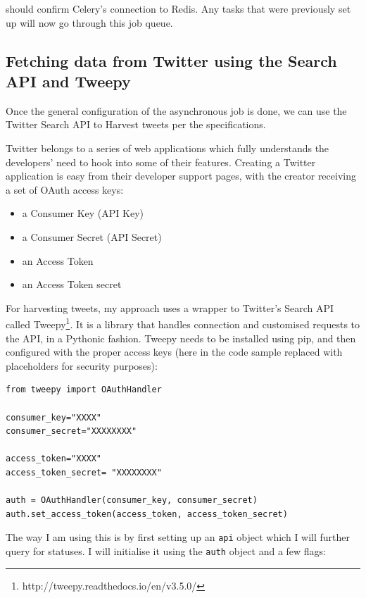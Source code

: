 should confirm Celery's connection to Redis. Any tasks that were previously set up will now go through this job queue.

\subsection{Fetching data from Twitter using the Search API and Tweepy}
Once the general configuration of the asynchronous job is done, we can use the Twitter Search API to Harvest tweets per the specifications.

Twitter belongs to a series of web applications which fully understands the developers' need to hook into some of their features. Creating a Twitter application is easy from their developer support pages, with the creator receiving a set of OAuth access keys:

\begin{itemize}
\item a Consumer Key (API Key)
\item a Consumer Secret (API Secret)
\item an Access Token
\item an Access Token secret
\end{itemize}

For harvesting tweets, my approach uses a wrapper to Twitter's Search API called Tweepy\footnote{http://tweepy.readthedocs.io/en/v3.5.0/}. It is a library that handles connection and customised requests to the API, in a Pythonic fashion. Tweepy needs to be installed using pip, and then configured with the proper access keys (here in the code sample replaced with placeholders for security purposes):

\lstset{basicstyle=\small}
\begin{lstlisting}
from tweepy import OAuthHandler

consumer_key="XXXX"
consumer_secret="XXXXXXXX"

access_token="XXXX"
access_token_secret= "XXXXXXXX"

auth = OAuthHandler(consumer_key, consumer_secret)
auth.set_access_token(access_token, access_token_secret)
\end{lstlisting}

The way I am using this is by first setting up an \texttt{api} object which I will further query for statuses. I will initialise it using the \texttt{auth} object and a few flags:

